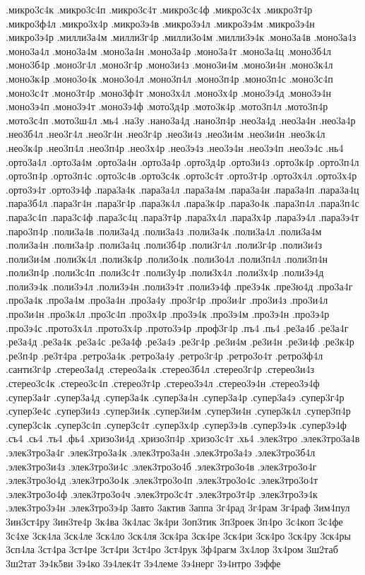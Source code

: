 {.микро3с4к
.микро3с4п
.микро3с4т
.микро3с4ф
.микро3с4х
.микро3т4р
.микро3ф4л
.микро3х4р
.микро3э4в
.микро3э4л
.микро3э4м
.микро3э4н
.микро3э4р
.милли3а4м
.милли3г4р
.милли3о4м
.милли3э4к
.моно3а4в
.моно3а4з
.моно3а4л
.моно3а4м
.моно3а4н
.моно3а4р
.моно3а4т
.моно3а4ц
.моно3б4л
.моно3б4р
.моно3г4л
.моно3г4р
.моно3и4з
.моно3и4м
.моно3и4н
.моно3к4л
.моно3к4р
.моно3о4к
.моно3о4л
.моно3п4л
.моно3п4р
.моно3п4с
.моно3с4п
.моно3с4т
.моно3т4р
.моно3ф4т
.моно3х4л
.моно3х4р
.моно3э4д
.моно3э4н
.моно3э4п
.моно3э4т
.моно3э4ф
.мото3д4р
.мото3к4р
.мото3п4л
.мото3п4р
.мото3с4п
.мото3ш4л
.мь4
.на3у
.нано3а4д
.нано3п4р
.нео3а4д
.нео3а4н
.нео3а4р
.нео3б4л
.нео3г4л
.нео3г4н
.нео3г4р
.нео3и4з
.нео3и4м
.нео3и4н
.нео3к4л
.нео3к4р
.нео3п4л
.нео3п4р
.нео3х4р
.нео3э4з
.нео3э4н
.нео3э4п
.нео3э4с
.нь4
.орто3а4л
.орто3а4м
.орто3а4н
.орто3а4р
.орто3д4р
.орто3и4з
.орто3к4р
.орто3п4л
.орто3п4р
.орто3п4с
.орто3с4в
.орто3с4к
.орто3с4т
.орто3т4р
.орто3х4л
.орто3х4р
.орто3э4т
.орто3э4ф
.пара3а4к
.пара3а4л
.пара3а4м
.пара3а4н
.пара3а4п
.пара3а4ц
.пара3б4л
.пара3г4н
.пара3г4р
.пара3к4л
.пара3к4р
.пара3о4к
.пара3п4л
.пара3п4с
.пара3с4п
.пара3с4ф
.пара3с4ц
.пара3т4р
.пара3х4л
.пара3х4р
.пара3э4л
.пара3э4т
.паро3п4р
.поли3а4в
.поли3а4д
.поли3а4з
.поли3а4к
.поли3а4л
.поли3а4м
.поли3а4н
.поли3а4р
.поли3а4ц
.поли3б4р
.поли3г4л
.поли3г4р
.поли3и4з
.поли3и4м
.поли3к4л
.поли3к4р
.поли3о4к
.поли3о4л
.поли3п4л
.поли3п4н
.поли3п4р
.поли3с4п
.поли3с4т
.поли3у4р
.поли3х4л
.поли3х4р
.поли3э4д
.поли3э4к
.поли3э4л
.поли3э4н
.поли3э4т
.поли3э4ф
.пре3э4к
.пре3ю4д
.про3а4г
.про3а4к
.про3а4м
.про3а4н
.про3а4у
.про3г4р
.про3и4г
.про3и4з
.про3и4л
.про3и4н
.про3к4л
.про3с4п
.про3х4р
.про3э4к
.про3э4м
.про3э4н
.про3э4р
.про3э4с
.прото3х4л
.прото3х4р
.прото3э4р
.проф3г4р
.пъ4
.пь4
.ре3а4б
.ре3а4г
.ре3а4д
.ре3а4к
.ре3а4с
.ре3а4ф
.ре3а4э
.ре3г4р
.ре3и4м
.ре3и4н
.ре3и4ф
.ре3к4р
.ре3п4р
.ре3т4ра
.ретро3а4к
.ретро3а4у
.ретро3г4р
.ретро3о4т
.ретро3ф4л
.санти3г4р
.стерео3а4д
.стерео3а4к
.стерео3б4л
.стерео3г4р
.стерео3и4з
.стерео3с4к
.стерео3с4п
.стерео3т4р
.стерео3э4л
.стерео3э4н
.стерео3э4ф
.супер3а4г
.супер3а4д
.супер3а4к
.супер3а4н
.супер3а4р
.супер3а4э
.супер3г4р
.супер3е4с
.супер3и4з
.супер3и4к
.супер3и4м
.супер3и4н
.супер3к4л
.супер3п4р
.супер3с4к
.супер3с4п
.супер3с4т
.супер3х4р
.супер3э4в
.супер3э4к
.супер3э4ф
.съ4
.сь4
.ть4
.фь4
.хризо3и4д
.хризо3п4р
.хризо3с4т
.хь4
.элек3тро
.элек3тро3а4в
.элек3тро3а4г
.элек3тро3а4к
.элек3тро3а4н
.элек3тро3а4э
.элек3тро3б4л
.элек3тро3и4з
.элек3тро3и4с
.элек3тро3о4б
.элек3тро3о4в
.элек3тро3о4г
.элек3тро3о4д
.элек3тро3о4к
.элек3тро3о4п
.элек3тро3о4с
.элек3тро3о4т
.элек3тро3о4ф
.элек3тро3о4ч
.элек3тро3с4т
.элек3тро3т4р
.элек3тро3э4к
.элек3тро3э4н
.элек3тро3э4р
3авто
3актив
3аппа
3г4рад
3г4рам
3г4раф
3им4пул
3ин3ст4ру
3ин3те4р
3к4ва
3к4лас
3к4ри
3оп3тик
3п3роек
3п4ро
3с4коп
3с4фе
3с4хе
3ск4ла
3ск4ле
3ск4ло
3ск4ля
3ск4ра
3ск4ре
3ск4ри
3ск4ро
3ск4ру
3ск4ры
3сп4ла
3ст4ра
3ст4ре
3ст4ри
3ст4ро
3ст4рук
3ф4рагм
3х4лор
3х4ром
3ш2таб
3ш2тат
3э4к5ви
3э4ко
3э4лек4т
3э4леме
3э4нерг
3э4нтро
3эффе
}
